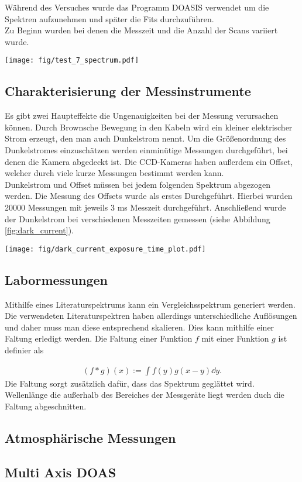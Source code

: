 \documentclass[12pt, a4paper, bibliography=totoc]{scrartcl}
\begin{document}
\begin{multicols}{2}
Während des Versuches wurde das Programm DOASIS verwendet um die Spektren aufzunehmen und später die Fits durchzuführen.\\
Zu Beginn wurden bei denen die Messzeit und die Anzahl der Scans variiert wurde.

\begin{center}
	\texttt{[image: fig/test\_7\_spectrum.pdf]}
	\label{fig:test_spectrum}

\end{center}

\subsection{Charakterisierung der Messinstrumente}
Es gibt zwei Haupteffekte die Ungenauigkeiten bei der Messung verursachen können.
Durch Brownsche Bewegung in den Kabeln wird ein kleiner elektrischer Strom erzeugt, den man auch Dunkelstrom nennt.
Um die Größenordnung des Dunkelstromes einzuschätzen werden einminütige Messungen durchgeführt, bei denen die Kamera abgedeckt ist.
Die CCD-Kameras haben außerdem ein Offset, welcher durch viele kurze Messungen bestimmt werden kann.\\
Dunkelstrom und Offset müssen bei jedem folgenden Spektrum abgezogen werden.
Die Messung des Offsets wurde als erstes Durchgeführt. 
Hierbei wurden 20000 Messungen mit jeweils $3$ \si{ms} Messzeit durchgeführt.
    Anschließend wurde der Dunkelstrom bei verschiedenen Messzeiten gemessen (siehe Abbildung \ref{fig:dark_current}).
\begin{center}
	\texttt{[image: fig/dark\_current\_exposure\_time\_plot.pdf]}
	\label{fig:dark_current}
\end{center}

\subsection{Labormessungen}
Mithilfe eines Literaturspektrums kann ein Vergleichsspektrum generiert werden. 
Die verwendeten Literaturspektren haben allerdings unterschiedliche Auflösungen und daher muss man diese entsprechend skalieren.
Dies kann mithilfe einer Faltung erledigt werden.
Die Faltung einer Funktion $f$ mit einer Funktion $g$ ist definier als

    \begin{align}
(f \ast g) (x) := \int f(y) g(x-y) \dd y .
    \end{align}
Die Faltung sorgt zusätzlich dafür, dass das Spektrum geglättet wird.
Wellenlänge die außerhalb des Bereiches der Messgeräte liegt werden duch die Faltung abgeschnitten.\\


\subsection{Atmosphärische Messungen}

\subsection{Multi Axis DOAS}



\end{multicols}
\end{document}
